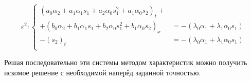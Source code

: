 \begin{equation*}
\varepsilon^{2}: 
\begin{cases}
(a_{0}\alpha_{2}+a_{1}\alpha_{1}s_{1}+a_{2}\alpha_{0} s_{1}^{2}+a_{1}\alpha_{0}s_{2})_{t}+\\+(b_{0}\alpha_{2}+b_{1}\alpha_{1} s_{1}+b_{2}\alpha_{0}s_{1}^{2}+b_{1}\alpha_{0} s_{2})_{x}&= -(\lambda_{0} \alpha_{1}+\lambda_{1}\alpha_{0}s_{1})\\
-(s_{2})_{t}&= - (\lambda_{0} \alpha_{1}+\lambda_{1}\alpha_{0}s_{1})\\
\end{cases}
\end{equation*}

\par Решая последовательно эти системы методом характеристик можно получить искомое решение с необходимой наперёд заданной точностью.